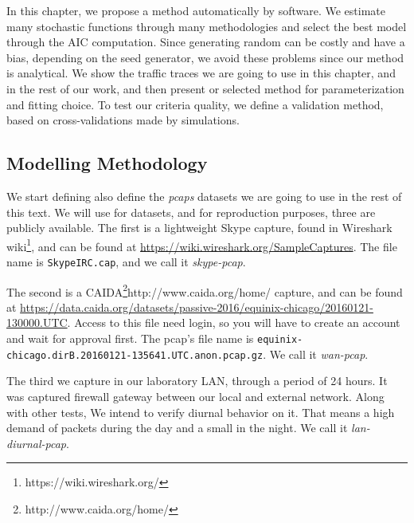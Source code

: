 In this chapter, we propose a method automatically by software. We estimate many stochastic functions through many methodologies and select the best model through the AIC computation\cite{bic-aic-comparision}. Since generating random can be costly and have a bias, depending on the seed generator, we avoid these problems since our method is analytical. We show the traffic traces we are going to use in this chapter, and in the rest of our work, and then present or selected method for parameterization and fitting choice. To test our criteria quality, we define a validation method, based on cross-validations made by simulations.


 

\subsection{Modelling Methodology}

We start defining also define the \textit{pcaps} datasets we are going to use in the rest of this text. We will use for datasets, and for reproduction purposes, three are publicly available. 
The first is a lightweight Skype capture, found in  Wireshark wiki\footnote{https://wiki.wireshark.org/}, and can be found at \href{https://wiki.wireshark.org/SampleCaptures}{https://wiki.wireshark.org/SampleCaptures}. The file name is \texttt{SkypeIRC.cap}, and we call it \textit{skype-pcap}.

The second is a CAIDA\footnote{http://www.caida.org/home/}{http://www.caida.org/home/} capture, and can be found at  \href{https://data.caida.org/datasets/passive-2016/equinix-chicago/20160121-130000.UTC}{https://data.caida.org/datasets/passive-2016/equinix-chicago/20160121-130000.UTC}. Access to this file need login, so you will have to create an account and wait for approval first. The pcap's file name is \texttt{equinix-chicago.dirB.20160121-135641.UTC.anon.pcap.gz}. We call it \textit{wan-pcap}.

The third we capture in our laboratory LAN, through a period of 24 hours. It was captured firewall gateway between our local and external network. Along with other tests, We intend to verify diurnal behavior on it. That means a high demand of packets during the day and a small in the night. We call it \textit{lan-diurnal-pcap}.

